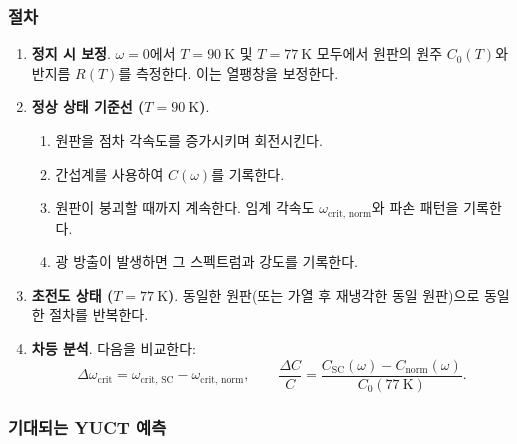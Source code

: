 \documentclass[12pt,a4paper]{article}
\begin{document}
	\subsubsection{절차}
	
	\begin{enumerate}
		\item \textbf{정지 시 보정}. \(\omega = 0\)에서 \(T = 90\ \text{K}\) 및 \(T = 77\ \text{K}\) 모두에서 원판의 원주 \(C_0(T)\)와 반지름 \(R(T)\)를 측정한다. 이는 열팽창을 보정한다.
		
		\item \textbf{정상 상태 기준선 (\(T = 90\ \text{K}\))}. 
		\begin{enumerate}
			\item 원판을 점차 각속도를 증가시키며 회전시킨다.
			\item 간섭계를 사용하여 \(C(\omega)\)를 기록한다.
			\item 원판이 붕괴할 때까지 계속한다. 임계 각속도 \(\omega_{\text{crit, norm}}\)와 파손 패턴을 기록한다.
			\item 광 방출이 발생하면 그 스펙트럼과 강도를 기록한다.
		\end{enumerate}
		
		\item \textbf{초전도 상태 (\(T = 77\ \text{K}\))}. 동일한 원판(또는 가열 후 재냉각한 동일 원판)으로 동일한 절차를 반복한다.
		
		\item \textbf{차등 분석}. 다음을 비교한다:
		\[
		\Delta \omega_{\text{crit}} = \omega_{\text{crit, SC}} - \omega_{\text{crit, norm}},\qquad
		\frac{\Delta C}{C} = \frac{C_{\text{SC}}(\omega) - C_{\text{norm}}(\omega)}{C_0(77\ \text{K})}.
		\]
	\end{enumerate}
	
	\subsubsection{기대되는 YUCT 예측}
	
\end{document}
